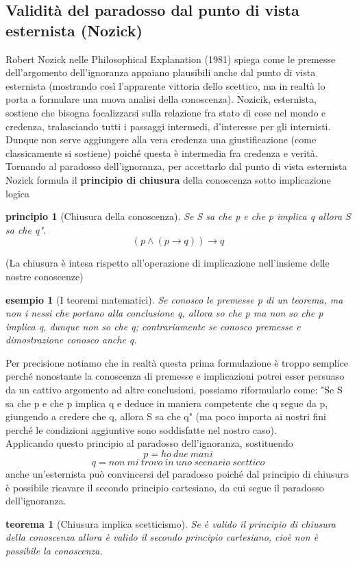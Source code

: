 \documentclass[10pt,a4paper]{article}
\newtheorem{teorema}{teorema}
\newtheorem{esempio}{esempio}
\newtheorem{principio}{principio}
\begin{document}
 \subsection{Validità del paradosso dal punto di vista esternista (Nozick)}
 Robert Nozick nelle Philosophical Explanation (1981) spiega come le premesse dell'argomento dell'ignoranza appaiano plausibili anche dal punto di vista esternista (mostrando così l'apparente vittoria dello scettico, ma in realtà lo porta a formulare una nuova analisi della conoscenza). Nozicik, esternista, sostiene che bisogna focalizzarsi sulla relazione fra stato di cose nel mondo e credenza, tralasciando tutti i passaggi intermedi, d'interesse per gli internisti. Dunque non serve aggiungere alla vera credenza una giustificazione (come classicamente si sostiene) poiché questa è intermedia fra credenza e verità. Tornando al paradosso dell'ignoranza, per accettarlo dal punto di vista esternista Nozick formula il \textbf{principio di chiusura} della conoscenza sotto implicazione logica
\begin{principio}[Chiusura della conoscenza]
	Se S sa che p e che p implica q allora S sa che q".\\
	\[(p \wedge (p\rightarrow q)) \rightarrow q\]
\end{principio}
(La chiusura è intesa rispetto all'operazione di implicazione nell'insieme delle nostre conoscenze)
\begin{esempio}[I teoremi matematici]
	Se conosco le premesse p di un teorema, ma non i nessi che portano alla conclusione q, allora so che p ma non so che p implica q, dunque non so che q; contrariamente se conosco premesse e dimostrazione conosco anche q.
\end{esempio}
Per precisione notiamo che in realtà questa prima formulazione è troppo semplice perché nonostante la conoscenza di premesse e implicazioni potrei esser persuaso da un cattivo argomento ad altre conclusioni, possiamo riformularlo come: "Se S sa che p e che p implica q e deduce in maniera competente che q segue da p, giungendo a credere che q, allora S sa che q" (ma poco importa ai nostri fini perché le condizioni aggiuntive sono soddisfatte nel nostro caso).\\
Applicando questo principio al paradosso dell'ignoranza, sostituendo
\[p = ho\ due\ mani \]
\[q = non\ mi\ trovo\ in\ uno\ scenario\ scettico\]
anche un'esternista può convincersi del paradosso poiché dal principio di chiusura è possibile ricavare il secondo principio cartesiano, da cui segue il paradosso dell'ignoranza. 
\begin{teorema}[Chiusura implica scetticismo]\label{thm:chiusura-scetticismo}
	Se è valido il principio di chiusura della conoscenza allora è valido il secondo principio cartesiano, cioè non è possibile la conoscenza.
\end{teorema}
\end{document}
